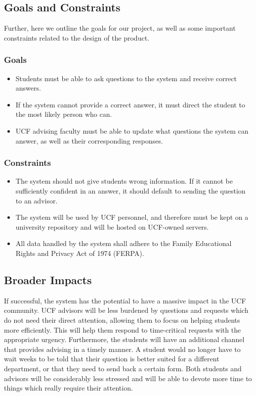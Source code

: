 \documentclass[titlepage, 12pt]{article}
\begin{document}
\subsection{Goals and Constraints}

Further, here we outline the goals for our project, as well as some important constraints related to the design of the product.

\subsubsection{Goals}

\begin{itemize}
  \item Students must be able to ask questions to the system and receive correct answers.
  \item If the system cannot provide a correct answer, it must direct the student to the most likely person who can.
  \item UCF advising faculty must be able to update what questions the system can answer, as well as their corresponding responses.
\end{itemize}

\subsubsection{Constraints}

\begin{itemize}
  \item The system should not give students wrong information. If it cannot be sufficiently confident in an answer, it should default to sending the question to an advisor.
  \item The system will be used by UCF personnel, and therefore must be kept on a university repository and will be hosted on UCF-owned servers.
  \item All data handled by the system shall adhere to the Family Educational Rights and Privacy Act of 1974 (FERPA).
\end{itemize}

\subsection{Broader Impacts}

If successful, the system has the potential to have a massive impact in the UCF community. UCF advisors will be less burdened by questions and requests which do not need their direct attention, allowing them to focus on helping students more efficiently. This will help them respond to time-critical requests with the appropriate urgency. Furthermore, the students will have an additional channel that provides advising in a timely manner. A student would no longer have to wait weeks to be told that their question is better suited for a different department, or that they need to send back a certain form. Both students and advisors will be considerably less stressed and will be able to devote more time to things which really require their attention.
\end{document}
